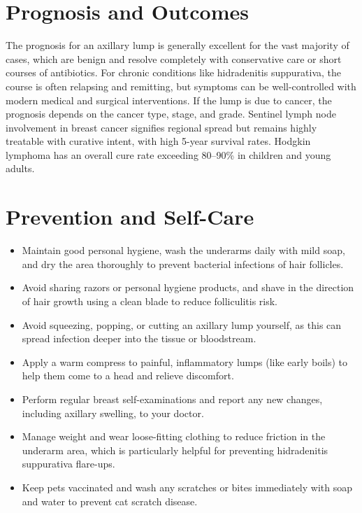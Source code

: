 \section*{Prognosis and Outcomes}
The prognosis for an axillary lump is generally excellent for the vast majority of cases, which are benign and resolve completely with conservative care or short courses of antibiotics. For chronic conditions like hidradenitis suppurativa, the course is often relapsing and remitting, but symptoms can be well-controlled with modern medical and surgical interventions. If the lump is due to cancer, the prognosis depends on the cancer type, stage, and grade. Sentinel lymph node involvement in breast cancer signifies regional spread but remains highly treatable with curative intent, with high 5-year survival rates. Hodgkin lymphoma has an overall cure rate exceeding 80--90\% in children and young adults.

\section*{Prevention and Self-Care}
\begin{itemize}
    \item Maintain good personal hygiene, wash the underarms daily with mild soap, and dry the area thoroughly to prevent bacterial infections of hair follicles.
    \item Avoid sharing razors or personal hygiene products, and shave in the direction of hair growth using a clean blade to reduce folliculitis risk.
    \item Avoid squeezing, popping, or cutting an axillary lump yourself, as this can spread infection deeper into the tissue or bloodstream.
    \item Apply a warm compress to painful, inflammatory lumps (like early boils) to help them come to a head and relieve discomfort.
    \item Perform regular breast self-examinations and report any new changes, including axillary swelling, to your doctor.
    \item Manage weight and wear loose-fitting clothing to reduce friction in the underarm area, which is particularly helpful for preventing hidradenitis suppurativa flare-ups.
    \item Keep pets vaccinated and wash any scratches or bites immediately with soap and water to prevent cat scratch disease.
\end{itemize}

